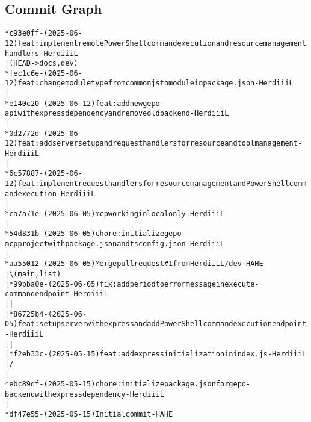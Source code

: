 \pagebreak

\subsection*{Commit Graph}
\begin{alltt}
* c93e0ff - (2025-06-12) feat: implement remote PowerShell command execution and resource management handlers - HerdiiiL
|  (HEAD -> docs, dev)
* fec1c6e - (2025-06-12) feat: change module type from commonjs to module in package.json - HerdiiiL
| 
* e140c20 - (2025-06-12) feat: add new gepo-api with express dependency and remove old backend - HerdiiiL
| 
* 0d2772d - (2025-06-12) feat: add server setup and request handlers for resource and tool management - HerdiiiL
| 
* 6c57887 - (2025-06-12) feat: implement request handlers for resource management and PowerShell command execution - HerdiiiL
| 
* ca7a71e - (2025-06-05) mcp working in local only - HerdiiiL
| 
* 54d831b - (2025-06-05) chore: initialize gepo-mcp project with package.json and tsconfig.json - HerdiiiL
|   
*   aa55012 - (2025-06-05) Merge pull request \#1 from HerdiiiL/dev - HAHE
|\textbackslash{}   (main, list)
| * 99bba0e - (2025-06-05) fix: add period to error message in execute-command endpoint - HerdiiiL
| | 
| * 86725b4 - (2025-06-05) feat: set up server with express and add PowerShell command execution endpoint - HerdiiiL
| | 
| * f2eb33c - (2025-05-15) feat: add express initialization in index.js - HerdiiiL
|/  
| 
* ebc89df - (2025-05-15) chore: initialize package.json for gepo-backend with express dependency - HerdiiiL
| 
* df47e55 - (2025-05-15) Initial commit - HAHE
\end{alltt}

\pagebreak

